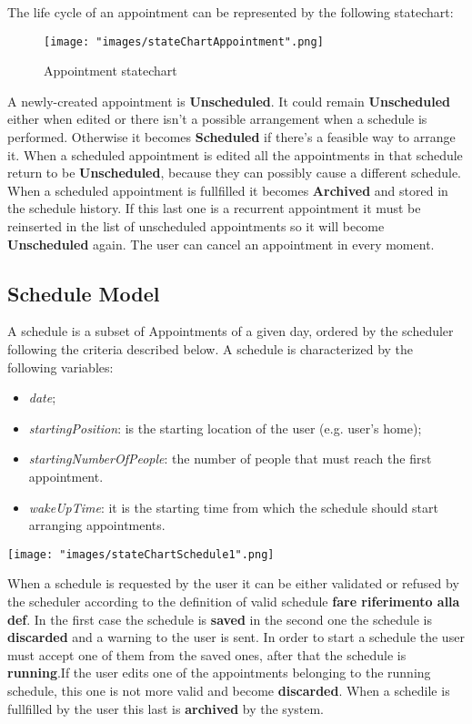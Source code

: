 The life cycle of an appointment can be represented by the following statechart:
\begin{figure}[H]
\begin{center}
\texttt{[image: "images/stateChartAppointment".png]}
\caption{Appointment statechart}
\label{fig:stchartApp}
\end{center}
\end{figure}

A newly-created appointment is \textbf{Unscheduled}. It could remain \textbf{Unscheduled} either when edited or there isn't a possible arrangement when a schedule is performed. Otherwise it becomes \textbf{Scheduled} if there's a feasible way to arrange it. When a scheduled appointment is edited all the appointments in that schedule return to be \textbf{Unscheduled}, because they can possibly cause a different schedule. When a scheduled appointment is fullfilled it becomes \textbf{Archived} and stored in the schedule history. If this last one is a recurrent appointment it must be reinserted in the list of unscheduled appointments so it will become \textbf{Unscheduled} again. The user can cancel an appointment in every moment. 

\subsection{Schedule Model} \label{subsect:schmodel}
A schedule is a subset of Appointments of a  given day, ordered by the scheduler following the criteria described below.
A schedule is characterized by the following variables:
\begin{itemize}
\item \textit{date};
\item \textit{startingPosition}: is the starting location of the user (e.g. user's home);
\item \textit{startingNumberOfPeople}: the number of people that must reach the first appointment.
\item \textit{wakeUpTime}: it is the starting time from which the schedule should start arranging appointments.
\end{itemize}

\texttt{[image: "images/stateChartSchedule1".png]}

When a schedule is requested by the user it can be either validated or refused by the scheduler according to the definition of valid schedule \textbf{fare riferimento alla def}.
In the first case the schedule is \textbf{saved} in the second one the schedule is \textbf{discarded} and a warning to the user is sent. In order to start a schedule the user must accept one of them from the saved ones, after that the schedule is \textbf{running}.If the user edits one of the appointments belonging to the running schedule, this one is not more valid and become \textbf{discarded}. When a schedile is fullfilled by the user this last is \textbf{archived} by the system.

